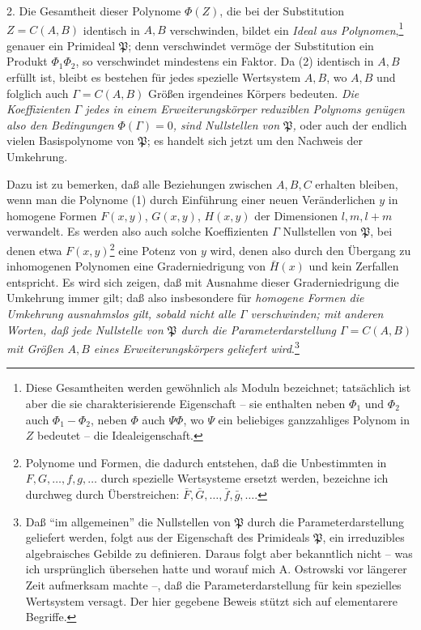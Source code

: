 \documentclass[11pt]{article}
\begin{document}
2. Die Gesamtheit dieser Polynome $\Phi(Z)$, die bei der Substitution $Z=C(A,B)$ identisch in $A,B$ verschwinden, bildet ein \emph{Ideal aus Polynomen},\footnote{Diese Gesamtheiten werden gewöhnlich als Moduln bezeichnet; tatsächlich ist aber die sie charakterisierende Eigenschaft -- sie enthalten neben $\Phi_1$ und $\Phi_2$ auch $\Phi_1-\Phi_2$, neben $\Phi$ auch $\Psi\Phi$, wo $\Psi$ ein beliebiges ganzzahliges Polynom in $Z$ bedeutet -- die Idealeigenschaft.} genauer ein Primideal $\mathfrak P$; denn verschwindet vermöge der Substitution ein Produkt $\Phi_1\Phi_2$, so verschwindet mindestens ein Faktor. Da (2) identisch in $A,B$ erfüllt ist, bleibt es bestehen für jedes spezielle Wertsystem $A,B$, wo $A,B$ und folglich auch $\Gamma=C(A,B)$ Größen irgendeines Körpers bedeuten. \emph{Die Koeffizienten $\Gamma$ jedes in einem Erweiterungskörper reduziblen Polynoms genügen also den Bedingungen $\Phi(\Gamma)=0$, sind Nullstellen von $\mathfrak P$,} oder auch der endlich vielen Basispolynome von $\mathfrak P$; es handelt sich jetzt um den Nachweis der Umkehrung.

Dazu ist zu bemerken, daß alle Beziehungen zwischen $A,B,C$ erhalten bleiben, wenn man die Polynome (1) durch Einführung einer neuen Veränderlichen $y$ in homogene Formen $F(x,y)$, $G(x,y)$, $H(x,y)$ der Dimensionen $l,m,l+m$ verwandelt. Es werden also auch solche Koeffizienten $\Gamma$ Nullstellen von $\mathfrak P$, bei denen etwa $F(x,y)$\footnote{Polynome und Formen, die dadurch entstehen, daß die Unbestimmten in $F,G,\ldots,f,g,\ldots$ durch spezielle Wertsysteme ersetzt werden, bezeichne ich durchweg durch Überstreichen: $\bar F,\bar G,\ldots,\bar f,\bar g,\ldots$.} eine Potenz von $y$ wird, denen also durch den Übergang zu inhomogenen Polynomen eine Graderniedrigung von $\bar H(x)$ und kein Zerfallen entspricht. Es wird sich zeigen, daß mit Ausnahme dieser Graderniedrigung die Umkehrung immer gilt; daß also insbesondere für \emph{homogene Formen die Umkehrung ausnahmslos gilt, sobald nicht alle $\Gamma$ verschwinden; mit anderen Worten, daß jede Nullstelle von $\mathfrak P$ durch die Parameterdarstellung $\Gamma=C(A,B)$ mit Größen $A,B$ eines Erweiterungskörpers geliefert wird}.\footnote{Daß ``im allgemeinen'' die Nullstellen von $\mathfrak P$ durch die Parameterdarstellung geliefert werden, folgt aus der Eigenschaft des Primideals $\mathfrak P$, ein irreduzibles algebraisches Gebilde zu definieren. Daraus folgt aber bekanntlich nicht -- was ich ursprünglich übersehen hatte und worauf mich A. Ostrowski vor längerer Zeit aufmerksam machte --, daß die Parameterdarstellung für kein spezielles Wertsystem versagt. Der hier gegebene Beweis stützt sich auf elementarere Begriffe.}
\end{document}
